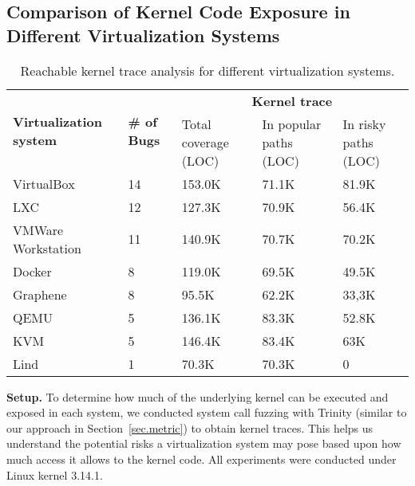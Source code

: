 {{{\subsection{Comparison of Kernel Code Exposure in Different Virtualization
Systems}
\label{Reachable-Kernel-Trace-Analysis-for-Different-Virtualization-Systems}
\begin{table}
\centering
\scriptsize
\begin{tabular}{|l|l|l|l|l|}
  \hline
  \multirow{3}{1.5cm}{\bf Virtualization system} & \multirow{3}{0.5cm}{\bf \# of Bugs} & \multicolumn{3}{c|}{\bf Kernel trace} \\ \cline{3-5}
  & & \multirow{2}{1.5cm}{Total coverage (LOC)} & \multirow{2}{1.5cm}{In popular paths (LOC)} & \multirow{2}{1.5cm}{In risky paths (LOC)}  \\
  & & & & \\  \hline
  VirtualBox & 14 & 153.0K & 71.1K & 81.9K \\
  \hline
  LXC & 12 & 127.3K & 70.9K & 56.4K \\
  \hline
  \multirow{2}{1.5cm}{VMWare Workstation} & \multirow{2}{*}{11} &
  \multirow{2}{*}{140.9K} & \multirow{2}{*}{70.7K} &\multirow{2}{*}{70.2K} \\
  & & & & \\   \hline
  Docker & 8 & 119.0K & 69.5K & 49.5K \\
  \hline
  Graphene & 8 & 95.5K & 62.2K & 33,3K \\
  \hline
  QEMU & 5 & 136.1K & 83.3K & 52.8K \\
  \hline
  KVM & 5 & 146.4K & 83.4K & 63K \\
  \hline
  Lind & 1 & 70.3K & 70.3K & 0 \\
  \hline
\end{tabular}
\caption{\small Reachable kernel trace analysis for different virtualization
systems.}
\label{table:trace-systems}
\end{table}


\noindent
\textbf{Setup.}
To determine how much of the underlying kernel can be executed and exposed in
each system,
we conducted system call fuzzing with Trinity (similar to our approach in
Section~{\ref{sec.metric}}) to obtain
kernel traces. This helps us understand the potential risks a virtualization system
may pose based upon how much access it allows to the kernel code.
All experiments were conducted under Linux kernel 3.14.1.

}}}
